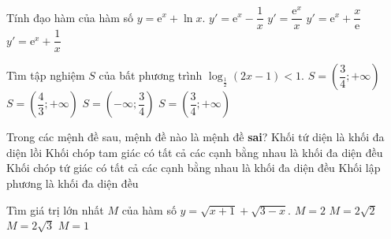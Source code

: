 \begin{ex}%
 Tính đạo hàm của hàm số $y = \mathrm{e}^x+\ln x.$
\choice
{$y' =  \mathrm{e}^x-\dfrac{1}{x}$}
{$y' = \dfrac{ \mathrm{e}^x}{x}$}
{$y' =  \mathrm{e}^x+\dfrac{x}{ \mathrm{e}}$}
{\True $y' =  \mathrm{e}^x+\dfrac{1}{x}$}
\end{ex}


\begin{ex}%
Tìm tập nghiệm $S$ của bất phương trình $\log_{\frac{1}{2}}(2x-1)< 1.$
\choice
{\True  $S= \left(\dfrac{3}{4}; +\infty \right) $}
{$S= \left(\dfrac{4}{3}; +\infty \right) $}
{$S= \left(-\infty;\dfrac{3}{4} \right) $}
{$S= \left(\dfrac{3}{4}; +\infty \right) $}
\end{ex}





\begin{ex}%
Trong các mệnh đề sau, mệnh đề nào là mệnh đề {\bf sai}?
\choice
{Khối tứ diện là  khối đa diện lồi}
{Khối chóp tam giác có tất cả các cạnh bằng nhau là khối đa diện đều}
{\True Khối chóp tứ giác có tất cả các cạnh bằng nhau là khối đa diện đều}
{Khối lập phương là khối đa diện đều}
\end{ex}


\begin{ex}%
Tìm giá trị lớn nhất  $M$ của hàm số $y = \sqrt{x+1}+\sqrt{3-x}$.
\choice
{$M=2$}
{\True $M=2\sqrt{2}$}
{$M=2\sqrt{3}$}
{$M=1$}
\end{ex}



